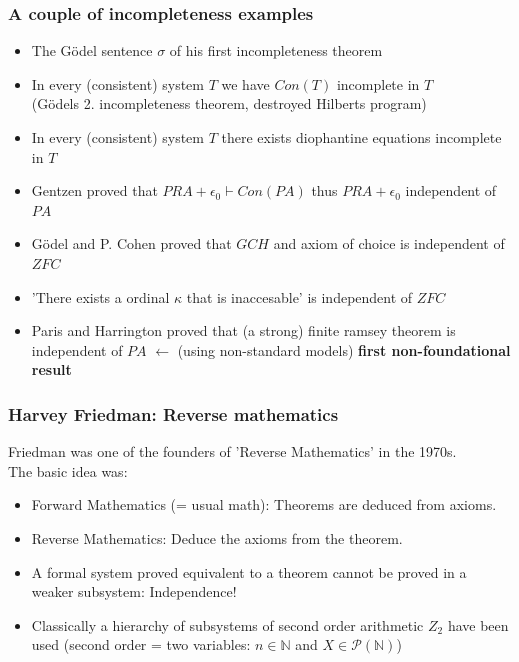 \documentclass[10pt,danish]{beamer}
\begin{document}
\begin{frame}
 \frametitle{A couple of incompleteness examples}
\begin{itemize}
 \item<1> The G\"odel sentence $\sigma$ of his first incompleteness theorem
 \item<2> In every (consistent) system $T$ we have $Con(T)$ incomplete in $T$\\ (G\"odels 2. incompleteness theorem, destroyed Hilberts program)
 \item<3> In every (consistent) system $T$ there exists diophantine equations incomplete in $T$%
 \item<4> Gentzen proved that $PRA + \epsilon_0 \vdash Con(PA)$ thus $PRA + \epsilon_0$ independent of $PA$
 \item<5> G\"odel and P. Cohen proved that $GCH$ and axiom of choice is independent of $ZFC$
 \item<6> 'There exists a ordinal $\kappa$ that is inaccesable' is independent of $ZFC$
 \item<7> Paris and Harrington proved that (a strong) finite ramsey theorem is independent of $PA$ $\leftarrow$ (using non-standard models) \textbf{first non-foundational result}
\end{itemize}
\end{frame}

\begin{frame}
 \frametitle{Harvey Friedman: Reverse mathematics}
Friedman was one of the founders of 'Reverse Mathematics' in the 1970s.\\
The basic idea was:
\begin{itemize}
\item Forward Mathematics (= usual math): Theorems are deduced from axioms. 
\item Reverse Mathematics: Deduce the axioms from the theorem. 
\item A formal system proved equivalent to a theorem cannot be proved in a weaker subsystem: Independence!
\item Classically a hierarchy of subsystems of second order arithmetic $Z_2$ have been used
    (second order = two variables: $n \in \mathbb{N}$ and $X \in \mathcal{P}(\mathbb{N})$)
\end{itemize}
\end{frame}
\end{document}
